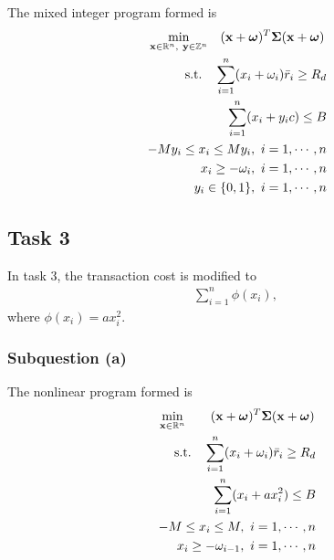 \documentclass[12pt]{ftec2101}
\newcommand{\vect}[1]{\mathbf{#1}}
\begin{document}
The mixed integer program formed is
\begin{gather}
    \min_{\vect{x}\in\mathbb{R}^n ,\  \vect{y}\in \mathbb{Z}^n} \quad (\vect{x}+\boldsymbol{\omega})^T \boldsymbol{\Sigma} (\vect{x}+\boldsymbol{\omega}) \\
    \label{mix:integer}
    \begin{aligned}
    \textup{s.t.} \quad \sum_{i=1}^{n} (x_i+\omega_i)\bar{r}_i \geq R_d\\
                \sum_{i=1}^{n} (x_i+y_i c) \leq B\\
                -M y_i \leq x_i \leq M y_i,\ i=1,\cdots,n\\
                x_i \geq -\omega_i,\ i = 1,\cdots,n\\
                y_i \in \{0,1\},\ i = 1,\cdots,n
\end{aligned}
\end{gather}
\subsection{Task 3}
In task 3, the transaction cost is modified to
\begin{align}
    \sum_{i=1}^n \phi(x_i) ,\ 
\end{align}
where $\phi(x_i) = ax_i^2$.
\subsubsection{Subquestion (a)}
The nonlinear program formed is 
\begin{gather}
    \min_{\vect{x} \in \mathbb{R}^{n}} \quad
    \quad (\vect{x}+\boldsymbol{\omega})^T \boldsymbol{\Sigma} (\vect{x}+\boldsymbol{\omega}) \\
\begin{aligned}
    \textup{s.t.} \quad \sum_{i=1}^{n} (x_i + \omega_i)\bar{r}_i \geq R_d \\
                        \sum_{i=1}^{n} (x_i + a x_i^2) \leq B \\
                        -M \leq x_i \leq M,\ i=1,\cdots,n \\
                        x_i \geq - \omega_{i - 1},\ i=1,\cdots,n
\end{aligned}
\label{nonlinear:p}
\end{gather}
\end{document}
